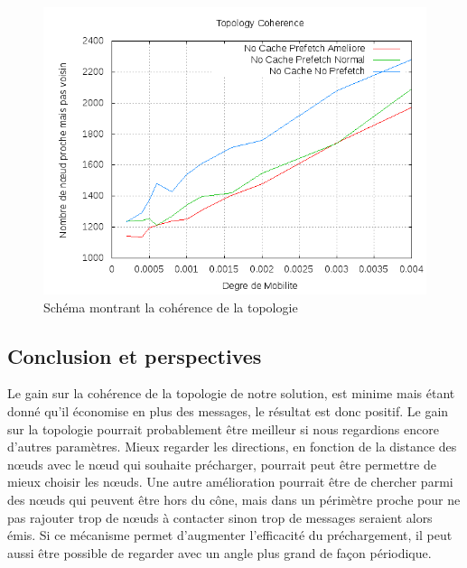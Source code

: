 	\begin{figure}[!h]
        \centering
        \includegraphics[scale=0.5]{../CacheCode/SolipsisPeersim/resultats/Courbes/Courbes_Final_Rapport/Topology_Coherence_Prefetchs.png}
	\caption{Schéma montrant la cohérence de la topologie}
	\label{courbeTopoPrefetch}
        \end{figure}



\subsection{Conclusion et perspectives}
Le gain sur la cohérence de la topologie de notre solution, est minime mais étant donné qu'il économise en plus des messages, le résultat est donc positif. Le gain sur la topologie pourrait probablement être meilleur si nous regardions encore d'autres paramètres. Mieux regarder les directions, en fonction de la distance des nœuds avec le nœud qui souhaite précharger, pourrait peut être permettre de mieux choisir les nœuds.
Une autre amélioration pourrait être de chercher parmi des nœuds qui peuvent être hors du cône, mais dans un périmètre proche pour ne pas rajouter trop de nœuds à contacter sinon trop de messages seraient alors émis. Si ce mécanisme permet d'augmenter l'efficacité du préchargement, il peut aussi être possible de regarder avec un angle plus grand de façon périodique.


\newpage
